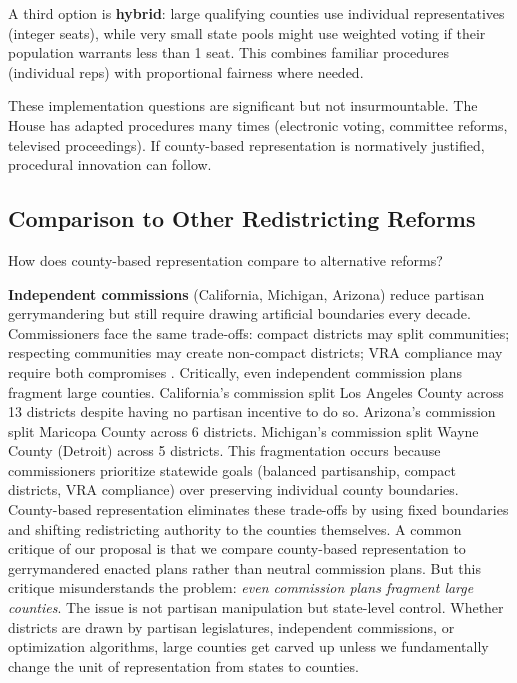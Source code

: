 A third option is \textbf{hybrid}: large qualifying counties use individual representatives (integer seats), while very small state pools might use weighted voting if their population warrants less than 1 seat. This combines familiar procedures (individual reps) with proportional fairness where needed.

These implementation questions are significant but not insurmountable. The House has adapted procedures many times (electronic voting, committee reforms, televised proceedings). If county-based representation is normatively justified, procedural innovation can follow.

\subsection{Comparison to Other Redistricting Reforms}

How does county-based representation compare to alternative reforms?

\textbf{Independent commissions} (California, Michigan, Arizona) reduce partisan gerrymandering but still require drawing artificial boundaries every decade. Commissioners face the same trade-offs: compact districts may split communities; respecting communities may create non-compact districts; VRA compliance may require both compromises \citep{cain1988reapportionment}. Critically, even independent commission plans fragment large counties. California's commission split Los Angeles County across 13 districts despite having no partisan incentive to do so. Arizona's commission split Maricopa County across 6 districts. Michigan's commission split Wayne County (Detroit) across 5 districts. This fragmentation occurs because commissioners prioritize statewide goals (balanced partisanship, compact districts, VRA compliance) over preserving individual county boundaries. County-based representation eliminates these trade-offs by using fixed boundaries and shifting redistricting authority to the counties themselves. A common critique of our proposal is that we compare county-based representation to gerrymandered enacted plans rather than neutral commission plans. But this critique misunderstands the problem: \emph{even commission plans fragment large counties}. The issue is not partisan manipulation but state-level control. Whether districts are drawn by partisan legislatures, independent commissions, or optimization algorithms, large counties get carved up unless we fundamentally change the unit of representation from states to counties.


